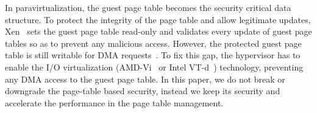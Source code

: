 


In paravirtualization, the guest page table becomes the security critical data structure.
To protect the integrity of the page table and allow legitimate updates, Xen~\cite{barham2003xen} sets the guest page table read-only and validates every update of guest page tables so as to prevent any malicious access.
However, the protected guest page table is still writable for DMA requests~\cite{disaggregation,adams2006comparison}.
To fix this gap, the hypervisor has to enable the I/O virtualization (AMD-Vi~\cite{amdvt} or Intel VT-d~\cite{intelvt}) technology, preventing any DMA access to the guest page table.
In this paper, we do not break or downgrade the page-table based security, instead we keep its security and accelerate the performance in the page table management.


